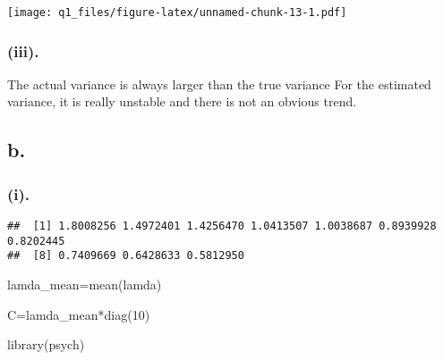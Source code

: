 \documentclass[
]{article}
\newenvironment{Shaded}{\begin{snugshade}}{\end{snugshade}}
\newcommand{\DecValTok}[1]{\textcolor[rgb]{0.00,0.00,0.81}{#1}}
\newcommand{\FunctionTok}[1]{\textcolor[rgb]{0.00,0.00,0.00}{#1}}
\newcommand{\NormalTok}[1]{#1}
\newcommand{\OtherTok}[1]{\textcolor[rgb]{0.56,0.35,0.01}{#1}}
\newcommand{\SpecialCharTok}[1]{\textcolor[rgb]{0.00,0.00,0.00}{#1}}
\begin{document}
\texttt{[image: q1\_files/figure-latex/unnamed-chunk-13-1.pdf]}

\hypertarget{iii.}{%
\subsubsection{(iii).}\label{iii.}}

The actual variance is always larger than the true variance For the
estimated variance, it is really unstable and there is not an obvious
trend.

\hypertarget{b.}{%
\subsection{b.}\label{b.}}

\hypertarget{i.-1}{%
\subsubsection{(i).}\label{i.-1}}

\begin{Shaded}
\end{Shaded}

\begin{verbatim}
##  [1] 1.8008256 1.4972401 1.4256470 1.0413507 1.0038687 0.8939928 0.8202445
##  [8] 0.7409669 0.6428633 0.5812950
\end{verbatim}

\begin{Shaded}
\begin{Highlighting}[]
\NormalTok{lamda\_mean}\OtherTok{=}\FunctionTok{mean}\NormalTok{(lamda)}
\end{Highlighting}
\end{Shaded}

\begin{Shaded}
\begin{Highlighting}[]
\NormalTok{C}\OtherTok{=}\NormalTok{lamda\_mean}\SpecialCharTok{*}\FunctionTok{diag}\NormalTok{(}\DecValTok{10}\NormalTok{)}
\end{Highlighting}
\end{Shaded}

\begin{Shaded}
\begin{Highlighting}[]
\FunctionTok{library}\NormalTok{(psych)}
\end{Highlighting}
\end{Shaded}
\end{document}
